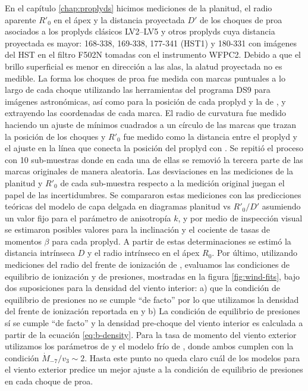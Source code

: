 En el capítulo \ref{chap:proplyds} hicimos mediciones de la planitud, el radio aparente $R'_0$ en el ápex y la distancia proyectada $D'$ de los choques de proa asociados a los proplyds clásicos LV2--LV5 y otros proplyds cuya distancia proyectada es mayor: 168-338, 169-338, 177-341 (HST1) y 180-331 con imágenes del HST en el filtro F502N tomadas con el instrumento WFPC2. Debido a que el brillo superficial es menor en dirección a las alas, la alatud proyectada no es medible. La forma los choques de proa fue medida con marcas puntuales a lo largo de cada choque utilizando las herramientas del programa DS9 para imágenes astronómicas, así como para la posición de cada proplyd y la de \thC{}, y extrayendo las coordenadas de cada marca. El radio de curvatura fue medido haciendo un ajuste de mínimos cuadrados a un círculo de las marcas que trazan la posición de los choques y $R'_0$ fue medido como la distancia entre el proplyd y el ajuste en la línea que conecta la posición del proplyd con \thC{}. Se repitió el proceso con 10 sub-muestras donde en cada una de ellas se removió la tercera parte de las marcas originales de manera aleatoria. Las desviaciones en las mediciones de la planitud y $R'_0$ de cada sub-muestra respecto a la medición original juegan el papel de las incertidumbres. Se compararon estas mediciones con las predicciones teóricas del modelo de capa delgada en diagramas planitud vs $R'_0/D'$ asumiendo un valor fijo para el parámetro de anisotropía $k$, y por medio de inspección visual se estimaron posibles valores para la inclinación y el cociente de tasas de momentos $\beta$ para cada proplyd. A partir de estas determinaciones se estimó la distancia intrínseca $D$ y el radio intrínseco en el ápex $R_0$. Por último, utilizando mediciones del radio del frente de ionización de \citet{Garcia-Arredondo:2001}, evaluamos las condiciones de equilibrio de ionización y de presiones, mostradas en la figura \ref{fig:wind-fits}, bajo dos suposiciones para la densidad del viento interior: a) que la condición de equilibrio de presiones no se cumple ``de facto'' por lo que utilizamos la densidad del frente de ionización reportada en \citet{Garcia-Arredondo:2001} y b) La condición de equilibrio de presiones sí se cumple ``de facto'' y la densidad pre-choque del viento interior es calculada a partir de la ecuación \ref{eq:b-density}. Para la tasa de momento del viento exterior utilizamos los parámetros de \citet{GAH:2002} y el modelo frío de \citet{Gagne:2005}, donde ambos cumplen con la condición $\dot{M}_{-7}/v_{3} \sim 2$. Hasta este punto no queda claro cuál de los modelos para el viento exterior predice un mejor ajuste a la condición de equilibrio de presiones en cada choque de proa.

